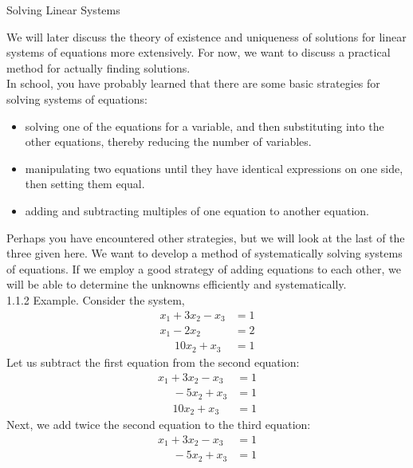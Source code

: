 \documentclass[smaller,hyperref={CJKbookmarks=true}]{beamer}
\begin{document}
\begin{frame}{Solving Linear Systems} \begin{spacing}{1}
We will later discuss the theory of existence and uniqueness of solutions
for linear systems of equations more extensively. For now, we want to
discuss a practical method for actually finding solutions.\\[3pt]
In school, you have probably learned that there are some basic strategies
for solving systems of equations:
\begin{itemize}
  \item solving one of the equations for a variable, and then substituting into
the other equations, thereby reducing the number of variables.
  \item manipulating two equations until they have identical expressions on
one side, then setting them equal.
  \item adding and subtracting multiples of one equation to another equation.
\end{itemize}
Perhaps you have encountered other strategies, but we will look at the last
of the three given here. We want to develop a method of systematically
solving systems of equations. If we employ a good strategy of adding
equations to each other, we will be able to determine the unknowns
ef{}ficiently and systematically.\\[6pt]
\newpage
\alert{1.1.2 Example.} Consider the system,
\begin{equation*}
  \begin{split}
     x_1+3x_2-x_3 &=1 \\
       x_1-2x_2~~~~~~~&=2 \\
       ~~~~~~10x_2+x_3&=1
  \end{split}
\end{equation*}
Let us subtract the first equation from the second equation:
\begin{equation*}
  \begin{split}
     x_1+3x_2-x_3 &=1 \\
      ~~~~~~-5x_2+x_3 &=1 \\
      ~~~~~~10x_2+x_3 &=1
  \end{split}
\end{equation*}
Next, we add twice the second equation to the third equation:
\begin{equation*}
  \begin{split}
     x_1+3x_2-x_3 &=1 \\
     ~~~~~~-5x_2+x_3 &=1  \\

\end{split}
\end{equation*}
\end{spacing}
\end{frame}
\end{document}
